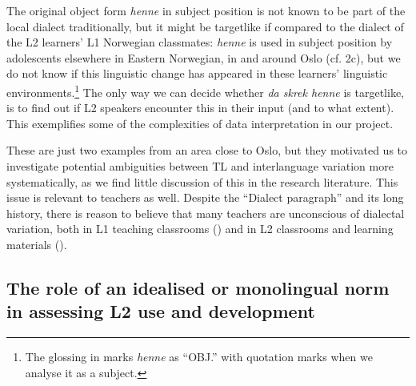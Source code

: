 \documentclass[output=paper,colorlinks,citecolor=brown,modfonts,nonflat]{../langscibook}
\begin{document}
The original object form \textit{henne} in subject position is not known to be part of the local dialect traditionally, but it might be targetlike if compared to the dialect of the L2 learners’ L1 Norwegian classmates: \textit{henne} is used in subject position by adolescents elsewhere in Eastern Norwegian, in and around Oslo (cf. 2c), but we do not know if this linguistic change has appeared in these learners’ linguistic environments.\footnote{{The glossing in  marks} {\textit{henne} }{as “OBJ.” with quotation marks when we analyse it as a subject.}} The only way we can decide whether \textit{da skrek henne}  is targetlike, is to find out if L2 speakers encounter this in their input (and to what extent). This exemplifies some of the complexities of data interpretation in our project.

These are just two examples from an area close to Oslo, but they motivated us to investigate potential ambiguities between TL and interlanguage variation more systematically, as we find little discussion of this in the research literature. This issue is relevant to teachers as well. Despite the ``Dialect paragraph'' and its long history, there is reason to believe that many teachers are unconscious of dialectal variation, \- both in L1 teaching classrooms (\citealt{Jahr1992, JanssonEtAl2017}) and in L2 classrooms and learning materials (\citealt{Husby2009, Heide2017}).

\subsection{The role of an idealised or monolingual norm in assessing L2 use and development}\label{sec:emilsen:2.2}
\end{document}
